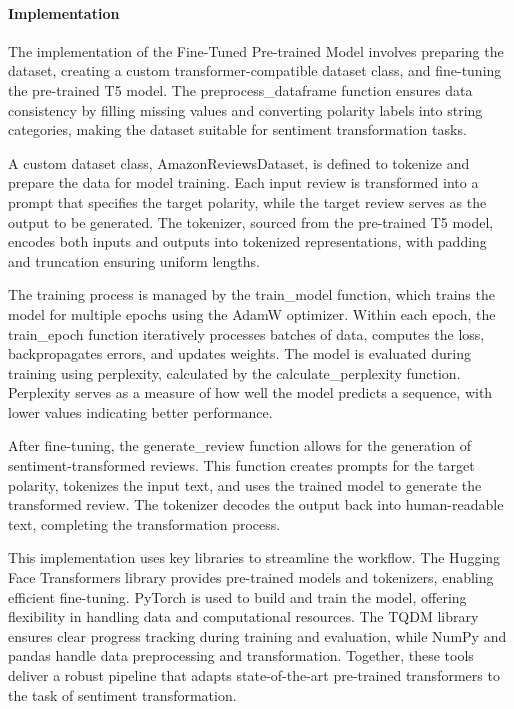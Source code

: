 \documentclass{article}
\begin{document}
\paragraph{Implementation}
The implementation of the Fine-Tuned Pre-trained Model involves preparing the dataset, creating a custom transformer-compatible dataset class, and fine-tuning the pre-trained T5 model. The preprocess\_dataframe function ensures data consistency by filling missing values and converting polarity labels into string categories, making the dataset suitable for sentiment transformation tasks.

A custom dataset class, AmazonReviewsDataset, is defined to tokenize and prepare the data for model training. Each input review is transformed into a prompt that specifies the target polarity, while the target review serves as the output to be generated. The tokenizer, sourced from the pre-trained T5 model, encodes both inputs and outputs into tokenized representations, with padding and truncation ensuring uniform lengths.

The training process is managed by the train\_model function, which trains the model for multiple epochs using the AdamW optimizer. Within each epoch, the train\_epoch function iteratively processes batches of data, computes the loss, backpropagates errors, and updates weights. The model is evaluated during training using perplexity, calculated by the calculate\_perplexity function. Perplexity serves as a measure of how well the model predicts a sequence, with lower values indicating better performance.

After fine-tuning, the generate\_review function allows for the generation of sentiment-transformed reviews. This function creates prompts for the target polarity, tokenizes the input text, and uses the trained model to generate the transformed review. The tokenizer decodes the output back into human-readable text, completing the transformation process.

This implementation uses key libraries to streamline the workflow. The Hugging Face Transformers library provides pre-trained models and tokenizers, enabling efficient fine-tuning. PyTorch is used to build and train the model, offering flexibility in handling data and computational resources. The TQDM library ensures clear progress tracking during training and evaluation, while NumPy and pandas handle data preprocessing and transformation. Together, these tools deliver a robust pipeline that adapts state-of-the-art pre-trained transformers to the task of sentiment transformation.
\end{document}
